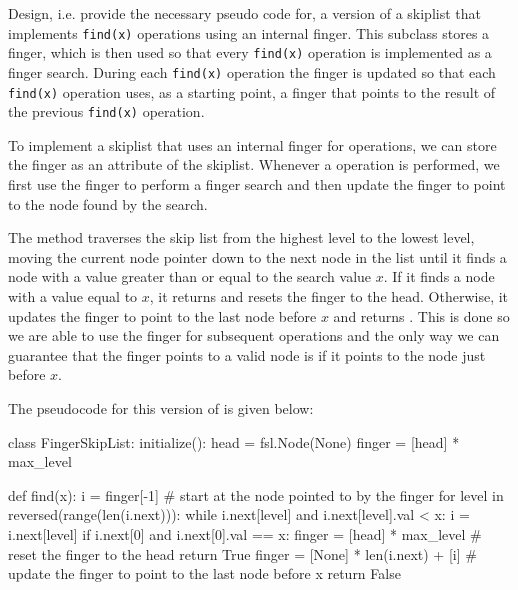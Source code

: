 \documentclass[addpoints]{exam}
\begin{document}
\begin{questions}
  Design, i.e. provide the necessary pseudo code for, a version of a skiplist that implements \texttt{find(x)} operations using an internal finger. This subclass stores a finger, which is then used so that every \texttt{find(x)} operation is implemented as a finger search. During each \texttt{find(x)} operation the finger is updated so that each \texttt{find(x)} operation uses, as a starting point, a finger that points to the result of the previous \texttt{find(x)} operation.
  \begin{solution}

    To implement a skiplist that uses an internal finger for  operations, we can store the finger as an attribute of the skiplist. Whenever a  operation is performed, we first use the finger to perform a finger search and then update the finger to point to the node found by the search.

    The  method traverses the skip list from the highest level to the lowest level, moving the current node pointer down to the next node in the list until it finds a node with a value greater than or equal to the search value $x$. If it finds a node with a value equal to $x$, it returns  and resets the finger to the head. Otherwise, it updates the finger to point to the last node before $x$ and returns . This is done so we are able to use the finger for subsequent  operations and the only way we can guarantee that the finger points to a valid node is if it points to the node just before $x$.

    The pseudocode for this version of  is given below:

    \begin{python}
      class FingerSkipList:
        initialize():
          head = fsl.Node(None)
          finger = [head] * max_level
            
        def find(x):
          i = finger[-1]  # start at the node pointed to by the finger
          for level in reversed(range(len(i.next))):
            while i.next[level] and i.next[level].val < x:
              i = i.next[level]
          if i.next[0] and i.next[0].val == x:
            finger = [head] * max_level  # reset the finger to the head
            return True
          finger = [None] * len(i.next) + [i]  
          # update the finger to point to the last node before x
          return False
    \end{python}

  \end{solution}

\end{questions}
\end{document}
